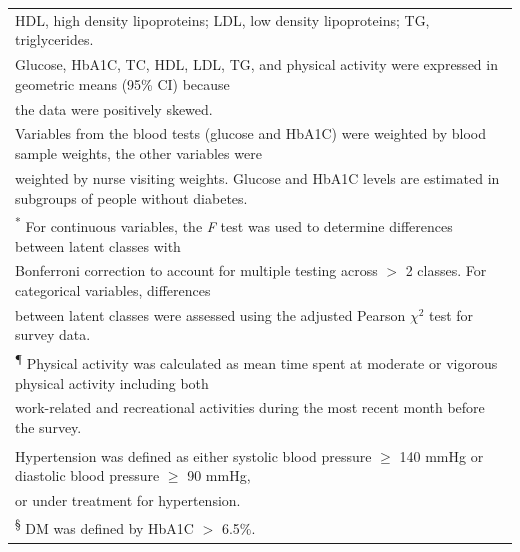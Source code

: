 \begin{table}[H]
\begin{tabular}[t]{lcccc}
		\multicolumn{5}{l}{{\scriptsize HDL, high density lipoproteins; LDL, low density lipoproteins; TG, triglycerides.}} \\
		\multicolumn{5}{l}{{\scriptsize Glucose, HbA1C, TC, HDL, LDL, TG, and physical activity were expressed in geometric means (95\% CI) because }} \\
		\multicolumn{5}{l}{ the data were positively skewed.} \\
		\multicolumn{5}{l}{{\scriptsize Variables from the blood tests (glucose and HbA1C) were weighted by blood sample weights, the other variables were}}\\ 
		\multicolumn{5}{l}{{\scriptsize  weighted by nurse visiting weights. Glucose and HbA1C levels are estimated in subgroups of people without diabetes.}}\\
		\multicolumn{5}{l}{\textsuperscript{*} For continuous variables, the \textit{F} test was used to determine differences between latent classes with}\\ 
		\multicolumn{5}{l}{{\scriptsize  Bonferroni correction to account for multiple testing across $>$ 2 classes. For categorical variables, differences}}\\
		\multicolumn{5}{l}{{\scriptsize  between latent classes were assessed using the adjusted Pearson $\chi^2$ test for survey data.}}\\ 
		\multicolumn{5}{l}{{\scriptsize \textsuperscript{\P} Physical activity was calculated as mean time spent at moderate or vigorous physical activity including both }}\\
		\multicolumn{5}{l}{{\scriptsize work-related and recreational activities during the most recent month before the survey.}}\\
		
		\multicolumn{5}{l}{{\scriptsize \textsuperscript{\dag} Hypertension was defined as either systolic blood pressure $\geqslant$ 140 mmHg or diastolic blood pressure $\geqslant$ 90 mmHg,}}\\
		\multicolumn{5}{l}{{\scriptsize or under treatment for hypertension.}}\\
		\multicolumn{5}{l}{{\scriptsize \textsuperscript{\S} DM was defined by HbA1C $>$ 6.5\%.}}\\
	\end{tabular}
\end{table}

